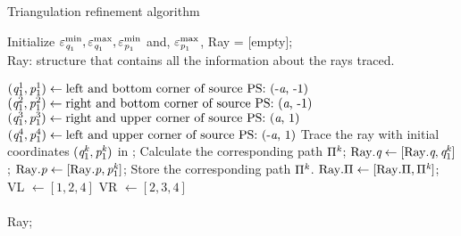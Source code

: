 \begin{algorithm}[h]
\caption{Triangulation refinement algorithm}\label{alg:triangulation}
Initialize $\varepsilon_{\textit{q}_1}^{\textrm{min}}, \varepsilon_{\textit{q}_1}^{\textrm{max}}, \varepsilon_{\textit{p}_1}^{\textrm{min}}$ and,
 $\varepsilon_{\textit{p}_1}^{\textrm{max}}$, Ray = [empty];\\
\Comment Ray: structure that contains all the information about the rays traced.
\begin{algorithmic}[1]
\State $(\textit{q}_1^1, \textit{p}_1^1)\gets \mbox{left and bottom corner of source PS: (-\textit{a}, -1)}$
\State $(\textit{q}_1^2, \textit{p}_1^2) \gets \mbox{right and bottom corner of source PS:  (\textit{a}, -1)}$
\State $(\textit{q}_1^3, \textit{p}_1^3)  \gets \mbox{right and upper corner of source PS: (\textit{a}, 1)}$
\State $(\textit{q}_1^4, \textit{p}_1^4) \gets \mbox{left and upper corner of source PS: (-\textit{a}, 1)} $
\State Trace the ray with initial coordinates $(\textit{q}_1^{\textit{k}}, \textit{p}_1^{\textit{k}})$ in ;
\State Calculate the corresponding path $\Pi^{\textit{k}}$;
\State $\mbox{Ray}.\textit{q}\gets [\mbox{Ray}.\textit{q}, \textit{q}_1^{\textit{k}}]$;
\State $\mbox{Ray}.\textit{p}\gets [\mbox{Ray}.\textit{p}, \textit{p}_1^{\textit{k}}]$;
\State Store the corresponding path $\Pi^{\textit{k}}$.
\State $\mbox{Ray}.\Pi\gets [\mbox{Ray}.\Pi, \Pi^{\textit{k}}]$;
\EndFor
\State VL $\gets [1, 2, 4]$ 
\State VR $\gets [2,3, 4]$   
\State {} \\
\State {}  \\
\Return Ray;
\end{algorithmic}
\end{algorithm}
